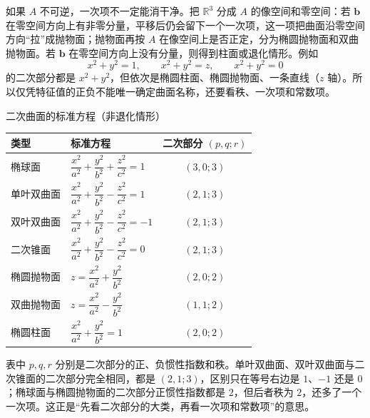 如果 $A$ 不可逆，一次项不一定能消干净。把 $\mathbb R^3$ 分成 $A$ 的像空间和零空间：若 $\mathbf{b}$ 在零空间方向上有非零分量，平移后仍会留下一个一次项，这一项把曲面沿零空间方向“拉”成抛物面；抛物面再按 $A$ 在像空间上是否正定，分为椭圆抛物面和双曲抛物面。若 $\mathbf{b}$ 在零空间方向上没有分量，则得到柱面或退化情形。例如
\[
x^2+y^2=1,\qquad x^2+y^2=z,\qquad x^2+y^2=0
\]
的二次部分都是 $x^2+y^2$，但依次是椭圆柱面、椭圆抛物面、一条直线（$z$ 轴）。所以仅凭特征值的正负不能唯一确定曲面名称，还要看秩、一次项和常数项。

\begin{tablebox}{二次曲面的标准方程（非退化情形）}
\centering\small
\begin{tabular}{llc}
\toprule
类型 & 标准方程 & 二次部分 $(p,q;r)$\\
\midrule
椭球面 & $\dfrac{x^2}{a^2}+\dfrac{y^2}{b^2}+\dfrac{z^2}{c^2}=1$ & $(3,0;3)$\\
单叶双曲面 & $\dfrac{x^2}{a^2}+\dfrac{y^2}{b^2}-\dfrac{z^2}{c^2}=1$ & $(2,1;3)$\\
双叶双曲面 & $\dfrac{x^2}{a^2}+\dfrac{y^2}{b^2}-\dfrac{z^2}{c^2}=-1$ & $(2,1;3)$\\
二次锥面 & $\dfrac{x^2}{a^2}+\dfrac{y^2}{b^2}-\dfrac{z^2}{c^2}=0$ & $(2,1;3)$\\
椭圆抛物面 & $z=\dfrac{x^2}{a^2}+\dfrac{y^2}{b^2}$ & $(2,0;2)$\\
双曲抛物面 & $z=\dfrac{x^2}{a^2}-\dfrac{y^2}{b^2}$ & $(1,1;2)$\\
椭圆柱面 & $\dfrac{x^2}{a^2}+\dfrac{y^2}{b^2}=1$ & $(2,0;2)$\\
\bottomrule
\end{tabular}
\end{tablebox}

表中 $p,q,r$ 分别是二次部分的正、负惯性指数和秩。单叶双曲面、双叶双曲面与二次锥面的二次部分完全相同，都是 $(2,1;3)$，区别只在等号右边是 $1$、$-1$ 还是 $0$；椭球面与椭圆抛物面的二次部分正惯性指数都是 $2$，但后者秩为 $2$，还多了一个一次项。这正是“先看二次部分的大类，再看一次项和常数项”的意思。

